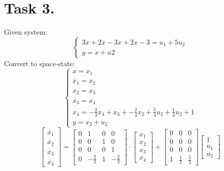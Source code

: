 \documentclass[a4paper,12pt]{article}
\begin{document}
\section{Task 3.}
Given system:
$$
\begin{cases}
    3\ddddot{x}+2\dddot{x}-3\ddot{x}+2\dot{x}-3=u_1+5u_2\\
    y=\dot{x}+u2
\end{cases}
$$
Convert to space-state:
$$
\begin{cases}
    x=x_1\\
    \dot{x_1}=x_2\\
    \dot{x_2}=x_3\\
    \dot{x_3}=x_4\\
    \dot{x_4}=-\frac{2}{3}x_4+x_3+-\frac{2}{3}x_2
    +\frac{5}{3}u_2+\frac{1}{3}u_2+1\\
    y=x_2+u_2
\end{cases}
$$
\begin{equation*}
    \begin{bmatrix}
        \dot{x_1}\\ \dot{x_2} \\
        \dot{x_3}\\ \dot{x_4}
    \end{bmatrix}
    =
    \begin{bmatrix}
        0 & 1 & 0 & 0\\
        0 & 0 & 1 & 0\\
        0 & 0 & 0 & 1\\
        0 & -\frac{2}{3} & 1 & -\frac{2}{3}
    \end{bmatrix}
    \cdot
    \begin{bmatrix}
        x_1 \\ x_2 \\ x_3 \\x_4
    \end{bmatrix}
    +
    \begin{bmatrix}
        0 & 0 & 0 \\
        0 & 0 & 0 \\
        0 & 0 & 0 \\
        1 & \frac{1}{3} & \frac{5}{3}
    \end{bmatrix}
    \begin{bmatrix}
        1 \\ u_1 \\ u_2
    \end{bmatrix}
\end{equation*}
\end{document}

